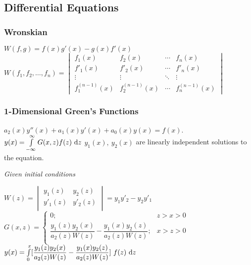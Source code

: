 		\subsection{Differential Equations}

\subsubsection{Wronskian}
\def \arraystretch{1.4}
\begin{itemize}
\itemt \( W(f,g) = f(x)g'(x) - g(x)f'(x) \)
\itemt \( W(f_1, f_2, \ldots , f_n) = 
\begin{vmatrix}
f_1(x)			& f_2(x)		& \cdots	& f_n(x) \\
f'_1(x)			& f'_2(x)		& \cdots	& f'_n(x) \\
\vdots			& \vdots		& \ddots	& \vdots \\
f^{(n-1)}_1(x)	& f^{(n-1)}_2(x)& \cdots	& f^{(n-1)}_n(x)
\end{vmatrix} \)
\end{itemize}

\subsubsection{1-Dimensional Green's Functions}
\begin{itemize}
\itemt \(  a_2(x)y''(x) + a_1(x)y'(x) + a_0(x)y(x) = f(x) \).
\itemt \( y(x) = \int\limits^\infty_{-\infty} G(x,z) f(z) \ \mathrm{d}z \)
\itemt \( y_1(x),\ y_2(x) \) are linearly independent solutions to the equation.
\end{itemize}

\textit{Given initial conditions}
\def \arraystretch{1.4}
\begin{itemize}
\itemt \( W(z) = 
\begin{vmatrix}
y_1(z)	&	y_2(z)	\\
y'_1(z)	&	y'_2(z)	\\
\end{vmatrix} = y_1 y'_2 - y_2 y'_1 \)
\itemt \( G(x,z) = 
\begin{cases}
0;									& z>x>0 \\
\dfrac{y_1(z)y_2(x)}{a_2(z)W(z)} - \dfrac{y_1(x)y_2(z)}{a_2(z)W(z)};	& x>z>0 \\
\end{cases}\)
\itemt \( y(x) = \int\limits^x_0 [\dfrac{y_1(z)y_2(x)}{a_2(z)W(z)} - \dfrac{y_1(x)y_2(z)}{a_2(z)W(z)}]\ f(z) \dn z \)
\end{itemize}

